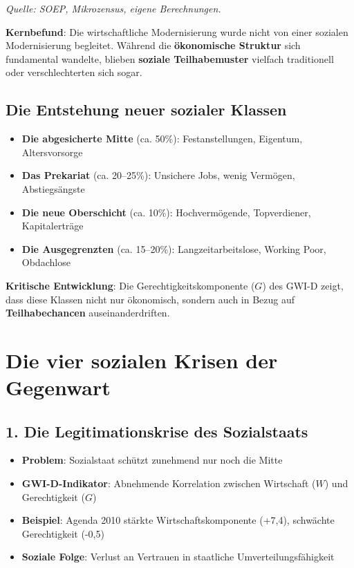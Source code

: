 \begin{flushleft}
\footnotesize{\textit{Quelle: SOEP, Mikrozensus, eigene Berechnungen.}}
\end{flushleft}

\textbf{Kernbefund}: Die wirtschaftliche Modernisierung wurde nicht von einer sozialen Modernisierung begleitet. Während die \textbf{ökonomische Struktur} sich fundamental wandelte, blieben \textbf{soziale Teilhabemuster} vielfach traditionell oder verschlechterten sich sogar.

\subsection{Die Entstehung neuer sozialer Klassen}

\begin{itemize}
    \item \textbf{Die abgesicherte Mitte} (ca. 50\%): Festanstellungen, Eigentum, Altersvorsorge
    \item \textbf{Das Prekariat} (ca. 20–25\%): Unsichere Jobs, wenig Vermögen, Abstiegsängste
    \item \textbf{Die neue Oberschicht} (ca. 10\%): Hochvermögende, Topverdiener, Kapitalerträge
    \item \textbf{Die Ausgegrenzten} (ca. 15–20\%): Langzeitarbeitslose, Working Poor, Obdachlose
\end{itemize}

\textbf{Kritische Entwicklung}: Die Gerechtigkeitskomponente (\(G\)) des GWI-D zeigt, dass diese Klassen nicht nur ökonomisch, sondern auch in Bezug auf \textbf{Teilhabechancen} auseinanderdriften.

\section{Die vier sozialen Krisen der Gegenwart}

\subsection{1. Die Legitimationskrise des Sozialstaats}

\begin{itemize}
    \item \textbf{Problem}: Sozialstaat schützt zunehmend nur noch die Mitte
    \item \textbf{GWI-D-Indikator}: Abnehmende Korrelation zwischen Wirtschaft (\(W\)) und Gerechtigkeit (\(G\))
    \item \textbf{Beispiel}: Agenda 2010 stärkte Wirtschaftskomponente (+7,4), schwächte Gerechtigkeit (-0,5)
    \item \textbf{Soziale Folge}: Verlust an Vertrauen in staatliche Umverteilungsfähigkeit
\end{itemize}

